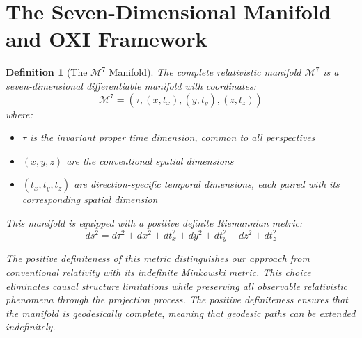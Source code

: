 \documentclass{article}
\newtheorem{definition}{Definition}
\begin{document}
\section{The Seven-Dimensional Manifold and OXI Framework}

\begin{definition}[The $\mathcal{M}^7$ Manifold]
The complete relativistic manifold $\mathcal{M}^7$ is a seven-dimensional differentiable manifold with coordinates:
\begin{equation}
\mathcal{M}^7 = (\tau, (x, t_x), (y, t_y), (z, t_z))
\end{equation}
where:
\begin{itemize}
\item $\tau$ is the invariant proper time dimension, common to all perspectives
\item $(x, y, z)$ are the conventional spatial dimensions
\item $(t_x, t_y, t_z)$ are direction-specific temporal dimensions, each paired with its corresponding spatial dimension
\end{itemize}

This manifold is equipped with a positive definite Riemannian metric:
\begin{equation}
ds^2 = d\tau^2 + dx^2 + dt_x^2 + dy^2 + dt_y^2 + dz^2 + dt_z^2
\end{equation}

The positive definiteness of this metric distinguishes our approach from conventional relativity with its indefinite Minkowski metric. This choice eliminates causal structure limitations while preserving all observable relativistic phenomena through the projection process. The positive definiteness ensures that the manifold is geodesically complete, meaning that geodesic paths can be extended indefinitely.
\end{definition}
\end{document}
